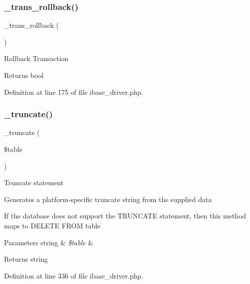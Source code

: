 \subsubsection{\texorpdfstring{\_trans\_rollback()}{\_trans\_rollback()}}
{\footnotesize\ttfamily \+\_\+trans\+\_\+rollback (\begin{DoxyParamCaption}{ }\end{DoxyParamCaption})\hspace{0.3cm}{\ttfamily [protected]}}

Rollback Transaction

\begin{DoxyReturn}{Returns}
bool 
\end{DoxyReturn}


Definition at line 175 of file ibase\+\_\+driver.\+php.

\mbox{\label{class_c_i___d_b__ibase__driver_aa029600528fc1ce660a23ff4b4667f95}} 
\subsubsection{\texorpdfstring{\_truncate()}{\_truncate()}}
{\footnotesize\ttfamily \+\_\+truncate (\begin{DoxyParamCaption}\item[{}]{\$table }\end{DoxyParamCaption})\hspace{0.3cm}{\ttfamily [protected]}}

Truncate statement

Generates a platform-\/specific truncate string from the supplied data

If the database does not support the T\+R\+U\+N\+C\+A\+TE statement, then this method maps to \textquotesingle{}D\+E\+L\+E\+TE F\+R\+OM table\textquotesingle{}


\begin{DoxyParams}[1]{Parameters}
string & {\em \$table} & \\
\hline
\end{DoxyParams}
\begin{DoxyReturn}{Returns}
string 
\end{DoxyReturn}


Definition at line 336 of file ibase\+\_\+driver.\+php.


